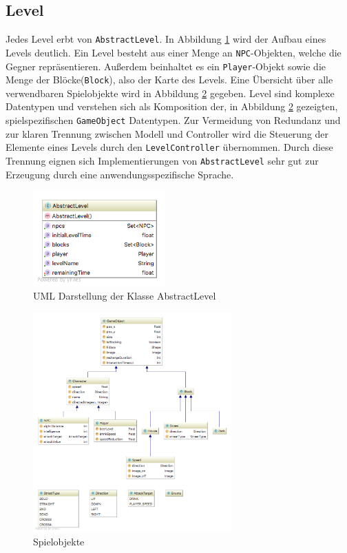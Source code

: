 \subsection{Level}
\label{sub:architektur:level}

Jedes Level erbt von \texttt{AbstractLevel}.
In Abbildung \ref{fig:spielarchitektur:abstractlevel} wird der Aufbau eines Levels deutlich.
Ein Level besteht aus einer Menge an \texttt{NPC}-Objekten, welche die Gegner repräsentieren.
Außerdem beinhaltet es ein \texttt{Player}-Objekt sowie die Menge der Blöcke(\texttt{Block}), also der Karte des Levels.
Eine Übersicht über alle verwendbaren Spielobjekte wird in Abbildung \ref{fig:spielarchitektur:model} gegeben.
Level sind komplexe Datentypen und verstehen sich als Komposition der, in Abbildung \ref{fig:spielarchitektur:model} gezeigten, spielspezifischen \texttt{GameObject} Datentypen.
Zur Vermeidung von Redundanz und zur klaren Trennung zwischen Modell und Controller wird die Steuerung der Elemente eines Levels durch den \texttt{LevelController} übernommen.
Durch diese Trennung eignen sich Implementierungen von \texttt{AbstractLevel} sehr gut zur Erzeugung durch eine anwendungsspezifische Sprache.

\begin{figure}[]
\centering
\includegraphics[width=2in]{img/05_abstractlevel_uml.png}
\caption{UML Darstellung der Klasse AbstractLevel}
\label{fig:spielarchitektur:abstractlevel}
\end{figure}

\begin{figure}[]
\centering
\includegraphics[width=3in]{img/05_model.png}
\caption{Spielobjekte}
\label{fig:spielarchitektur:model}
\end{figure}

